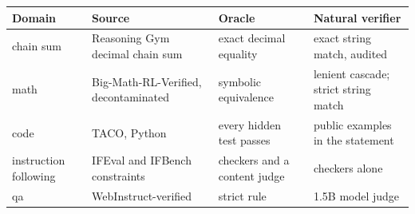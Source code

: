 \begin{tabular}{p{}p{}p{}p{}}
\toprule
Domain & Source & Oracle & Natural verifier \\
\midrule
chain sum & Reasoning Gym decimal chain sum & exact decimal equality & exact string match, audited \\
math & Big-Math-RL-Verified, decontaminated & symbolic equivalence & lenient cascade; strict string match \\
code & TACO, Python & every hidden test passes & public examples in the statement \\
instruction following & IFEval and IFBench constraints & checkers and a content judge & checkers alone \\
qa & WebInstruct-verified & strict rule & 1.5B model judge \\
\bottomrule
\end{tabular}
